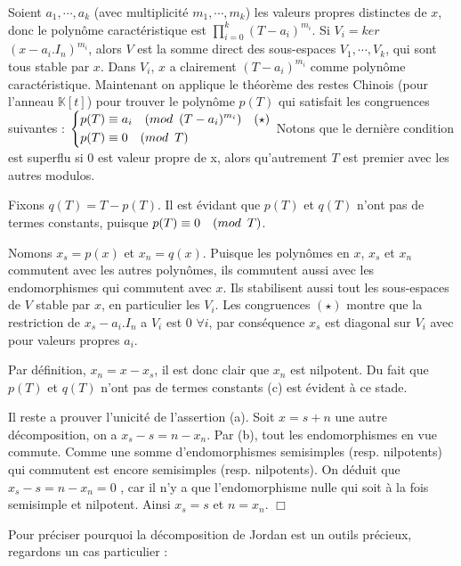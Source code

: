 \documentclass[a4paper,openany,12pt]{report}
\newcommand{\KK}{\mathbb{K}}
\theoremstyle{break}
{\theorembodyfont{\upshape}
\newtheorem*{rmq}{Remarque :}
\newtheorem*{prv}{Preuve :}
\newtheorem*{ex}{Exemples :}
\newtheorem{exe}{Exemple : }
\newtheorem*{nota}{Notation :}}
\begin{document}
\begin{prv}
\quad Soient $a_{1},\cdots,a_{k}$ (avec multiplicité $m_{1},\cdots,m_{k}$) les valeurs propres distinctes de $x$, donc le polynôme caractéristique est $\prod\limits_{i=0}^k  \left( T-a_{i} \right)^{m_{i}}$. Si $V_{i}=ker$ $(x-a_{i}.I_{n})^{m_{i}}$, alors $V$ est la somme direct des sous-espaces $V_{1}, \cdots, V_{k}$, qui sont tous stable par $x$. Dans $V_{i}$, $x$ a clairement $(T-a_{i})^{m_{i}}$ comme polynôme caractéristique.
\quad Maintenant on applique le théorème des restes Chinois (pour l'anneau $\KK [t]$) pour trouver le polynôme $p(T)$ qui satisfait les congruences suivantes :
$
\left\{
\begin{aligned}
p(T) & \equiv a_{i} \quad (mod \enskip (T-a_{i})^{m_{i}}) \quad (\star) \\
p(T) & \equiv 0 \quad (mod \enskip T)
\end{aligned}
\right. $
Notons que le dernière condition est superflu si 0 est valeur propre de x, alors qu'autrement $T$ est premier avec les autres modulos. 

Fixons $q(T)=T-p(T)$. Il est évidant que $p(T)$ et $q(T)$ n'ont pas de termes constants, puisque $p(T) \equiv 0 \quad (mod \enskip T)$.

Nomons $x_{s} = p(x)$ et $x_{n} = q(x)$. Puisque les polynômes en $x$, $x_{s}$ et $x_{n}$ commutent avec les autres polynômes, ils commutent aussi avec les endomorphismes qui commutent avec $x$. Ils stabilisent aussi tout les sous-espaces de $V$ stable par $x$, en particulier les $V_{i}$. Les congruences $(\star)$ montre que la restriction de $x_{s}-a_{i}.I_{n}$ a $V_{i}$ est 0 $\forall i$, par conséquence $x_{s}$ est diagonal sur $V_{i}$ avec pour valeurs propres $a_{i}$.

Par définition, $x_{n} = x - x_{s}$, il est donc clair que $x_{n}$ est nilpotent. Du fait que $p(T)$ et $q(T)$ n'ont pas de termes constants (c) est évident à ce stade. 

Il reste a prouver l'unicité de l'assertion (a). Soit $x=s+n$ une autre décomposition, on a $x_{s}-s=n-x_{n}$. Par (b), tout les endomorphismes en vue commute. Comme une somme d'endomorphismes semisimples (resp. nilpotents) qui commutent est encore semisimples (resp. nilpotents). On déduit que $x_{s}-s=n-x_{n}=0$ , car il n'y a que l'endomorphisme nulle qui soit à la fois semisimple et nilpotent. Ainsi $x_{s}=s$ et $n =x_{n}$. $\Box$
\end{prv}

Pour préciser pourquoi la décomposition de Jordan est un outils précieux, regardons un cas particulier :
\end{document}
